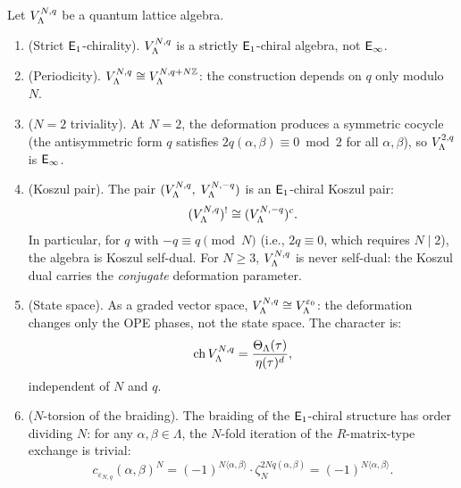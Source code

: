 \begin{theorem}
\label{thm:quantum-lattice-structure}
Let $V_\Lambda^{N,q}$ be a quantum lattice algebra.
\begin{enumerate}[label=(\roman*)]
\item \textup{(}Strict $\mathsf{E}_1$-chirality\textup{).}
  $V_\Lambda^{N,q}$ is a strictly $\mathsf{E}_1$-chiral algebra,
  not $\mathsf{E}_{\infty}$.

\item \textup{(}Periodicity\textup{).}
  $V_\Lambda^{N,q} \cong V_\Lambda^{N, q + N\mathbb{Z}}$:
  the construction depends on $q$ only modulo~$N$.

\item \textup{(}$N = 2$ triviality\textup{).}
  At $N = 2$, the deformation produces a symmetric cocycle
  \textup{(}the antisymmetric form $q$ satisfies
  $2q(\alpha,\beta) \equiv 0 \bmod 2$ for all
  $\alpha,\beta$\textup{)}, so $V_\Lambda^{2,q}$ is $\mathsf{E}_{\infty}$.

\item \textup{(}Koszul pair\textup{).}
  The pair $(V_\Lambda^{N,q},\; V_\Lambda^{N,-q})$ is an
  $\mathsf{E}_1$-chiral Koszul pair:
  \[
  (V_\Lambda^{N,q})^! \cong (V_\Lambda^{N,-q})^c.
  \]
  In particular, for $q$ with $-q \equiv q \pmod{N}$
  \textup{(}i.e., $2q \equiv 0$, which requires $N \mid 2$\textup{)},
  the algebra is Koszul self-dual.  For $N \geq 3$,
  $V_\Lambda^{N,q}$ is never self-dual: the Koszul dual carries
  the \emph{conjugate} deformation parameter.

\item \textup{(}State space\textup{).}
  As a graded vector space,
  $V_\Lambda^{N,q} \cong V_\Lambda^{\varepsilon_0}$:
  the deformation changes only the OPE phases, not the state space.
  The character is:
  \[
  \mathrm{ch}\, V_\Lambda^{N,q}
  = \frac{\Theta_\Lambda(\tau)}{\eta(\tau)^d},
  \]
  independent of $N$ and $q$.

\item \textup{(}$N$-torsion of the braiding\textup{).}
  The braiding of the $\mathsf{E}_1$-chiral structure has order dividing
  $N$: for any $\alpha, \beta \in \Lambda$, the $N$-fold iteration
  of the $R$-matrix-type exchange is trivial:
  \[
  c_{\varepsilon_{N,q}}(\alpha,\beta)^N
  = (-1)^{N\langle\alpha,\beta\rangle} \cdot \zeta_N^{2Nq(\alpha,\beta)}
  = (-1)^{N\langle\alpha,\beta\rangle}.
  \]
\end{enumerate}
\end{theorem}

